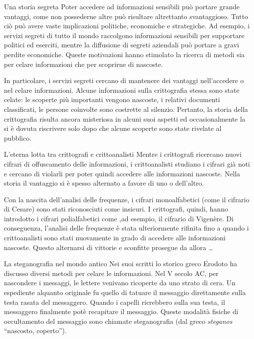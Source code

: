 \documentclass[final,hyperref={pdfpagelabels=false}]{beamer}
\begin{document}
\begin{frame}{}
    \begin{columns}[t]
    \begin{column}{.3\linewidth}
    \begin{block}{Una storia segreta}
      Poter accedere ad informazioni sensibili può portare grande vantaggi, come non possederne altre può risultare altrettanto svantaggioso. Tutto ciò può avere vaste implicazioni politiche, economiche e strategiche. Ad esempio, i servizi segreti di tutto il mondo raccolgono informazioni sensibili per supportare politici ed eserciti, mentre la diffusione di segreti aziendali può portare a gravi perdite economiche. Queste motivazioni hanno stimolato la ricerca di metodi sia per celare informazioni che per scoprirne di nascoste. \par
      In particolare, i servizi segreti cercano di mantenere dei vantaggi nell'accedere o nel celare informazioni. Alcune informazioni sulla crittografia stessa sono state celate: le scoperte più importanti vengono nascoste, i relativi documenti classificati, le persone coinvolte sono costrette al silenzio. Pertanto, la storia della crittografia risulta ancora misteriosa in alcuni suoi aspetti ed occasionalmente la si è dovuta riscrivere solo dopo che alcune scoperte sono state rivelate al pubblico.
    \end{block}
      \begin{block}{L'eterna lotta tra crittografi e crittoanalisti}
        Mentre i crittografi ricercano nuovi cifrari di offuscamento delle informazioni, i crittoanalisti studiano i cifrari già noti e cercano di violarli per poter quindi accedere alle informazioni nascoste. Nella storia il vantaggio si è spesso alternato a favore di uno o dell'altro. \par 
        Con la nascita dell'analisi delle frequenze, i cifrari monoalfabetici (come il cifrario di Cesare) sono stati riconosciuti come insicuri. I crittografi, quindi, hanno introdotto i cifrari polialfabetici come ,ad esempio, il cifrario di Vigenère. Di conseguenza, l'analisi delle frequenze è stata ulteriormente rifinita fino a quando i crittoanalisti sono stati nuovamente in grado di accedere alle informazioni nascoste. Questo alternarsi di vittorie e sconfitte prosegue da allora \ldots
      \end{block}
        \begin{block}{La steganografia nel mondo antico}
          Nei suoi scritti lo storico greco Erodoto ha discusso diversi metodi per celare le informazioni. Nel V secolo AC, per nascondere i messaggi, le lettere venivano ricoperte da uno strato di cera. Un espediente alquanto originale fu quello di tatuare il messaggio direttamente sulla testa rasata del messaggero. Quando i capelli ricrebbero sulla sua testa, il messaggero finalmente potè recapitare il messaggio. Queste modalità fisiche di occultamento del messaggio sono chiamate steganografia (dal greco {\it steganos} ``nascosto, coperto'').

\end{block}
\end{column}
\end{columns}
\end{frame}
\end{document}
